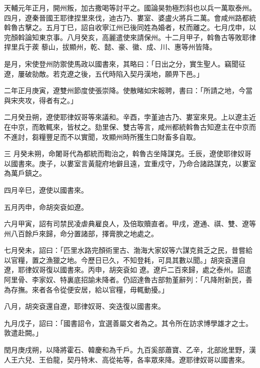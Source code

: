 \begin{pinyinscope}
 天輔元年正月，開州叛，加古撒喝等討平之。國論昊勃極烈斜也以兵一萬取泰州。四月，遼秦晉國王耶律捏里來伐，迪古乃、婁室、婆盧火將兵二萬。會咸州路都統斡魯古擊之。五月丁巳，詔自收寧江州已後同姓為婚者，杖而離之。七月戊申，以完顏斡論知東京事。八月癸亥，高麗遣使來請保州。十二月甲子，斡魯古等敗耶律捍里兵于蒺
 藜山，拔顯州，乾、懿、豪、徽、成、川、惠等州皆降。



 是月，宋使登州防禦使馬政以國書來，其略曰：「日出之分，實生聖人。竊聞征遼，屢破勍敵。若克遼之後，五代時陷入契丹漢地，願畀下邑。」



 二年正月庚寅，遼雙州節度使張崇降。使散睹如宋報聘，書曰：「所請之地，今當與宋夾攻，得者有之。」



 二月癸丑朔，遼使耶律奴哥等來議和。辛酉，孛堇迪古乃、婁室來見。上以遼主近在中京，而敢輒來，皆杖之。劾里保、雙古等言，咸州都統斡魯古知遼主在中京而不進討，芻糧豐足而不以實聞，攻顯州時所獲生口財畜多自取。



 三
 月癸未朔，命闍哥代為都統而鞫治之，斡魯古坐降謀克。壬辰，遼使耶律奴哥以國書來。庚子，以婁室言黃龍府地僻且遠，宜重戍守，乃命合諸路謀克，以婁室為萬戶鎮之。



 四月辛巳，遼使以國書來。



 五月丙申，命胡突袞如遼。



 六月甲寅，詔有司禁民凌虐典雇良人，及倍取贖直者。甲戌，遼通、祺、雙、遼等州八百餘戶來歸，命分置諸部，擇膏腴之地處之。



 七月癸未，詔曰：「匹里水路完顏術里古、渤海大家奴等六謀克貧乏之民，昔嘗給以官糧，置之漁獵之地。今歷日已久，不知登耗，可具其數以聞。」胡突袞還自遼，耶律奴哥復以國書來。丙申，胡突袞如
 遼。遼戶二百來歸，處之泰州。詔遣阿里骨、李家奴、特裏底招諭未降者。仍詔達魯古部勃堇辭列：「凡降附新民，善為存撫。來者各令從便安居，給以官糧，毋輒動擾。」



 八月，胡突袞還自遼，耶律奴哥、突迭復以國書來。



 九月戊子，詔曰：「國書詔令，宜選善屬文者為之。其令所在訪求博學雄才之士。敦遣赴闕。」



 閏月庚戌朔，以降將霍石、韓慶和為千戶。九百奚部蕭寶、乙辛，北部訛里野，漢人王六兒、王伯龍，契丹特末、高從祐等，各率眾來降。遼耶律奴哥以國書來。




\end{pinyinscope}
